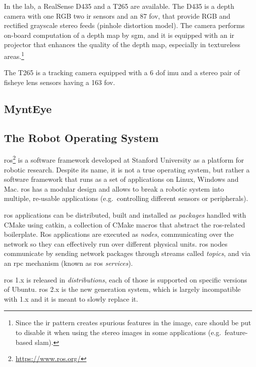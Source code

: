 \documentclass[11pt, letterpaper, twoside]{article}
\begin{document}
In the lab, a RealSense D435 and a T265 are available. The D435 is a depth
camera with one RGB two \gls{ir} sensors and an 87\textdegree{} \gls{fov}, that
provide RGB and rectified grayscale stereo feeds (pinhole distortion model).
The camera performs on-board computation of a depth map by \gls{sgm}, and it is
equipped with an \gls{ir} projector that enhances the quality of the depth map,
especially in textureless areas.\footnote{Since the \gls{ir} pattern creates
    spurious features in the image, care should be put to disable it when using
the stereo images in some applications (e.g.\ feature-based \gls{slam}).}

The T265 is a tracking camera equipped with a 6 \gls{dof} \gls{imu} and a
stereo pair of fisheye lens sensors having a 163\textdegree{} \gls{fov}.

\subsection{MyntEye}

\subsection{The Robot Operating System}

\gls{ros}\footnote{\url{https://www.ros.org/}} is a software framework
developed at Stanford University as a platform for robotic research. Despite
its name, it is not a true operating system, but rather a software framework
that runs as a set of applications on Linux, Windows and Mac. \gls{ros} has a
modular design and allows to break a robotic system into multiple, re-usable
applications (e.g.\ controlling different sensors or peripherals).

\gls{ros} applications can be distributed, built and installed as
\textit{packages} handled with CMake using catkin, a collection of CMake macros
that abstract the \gls{ros}-related boilerplate. Ros applications are executed
as \textit{nodes}, communicating over the network so they can effectively run
over different physical units. \gls{ros} nodes communicate by sending network
packages through streams called \textit{topics}, and via an \gls{rpc} mechanism
(known as \gls{ros} \textit{services}).

\gls{ros} 1.x is released in \textit{distributions}, each of those is supported
on specific versions of Ubuntu. \gls{ros} 2.x is the new generation system,
which is largely incompatible with 1.x and it is meant to slowly replace it.
\end{document}
